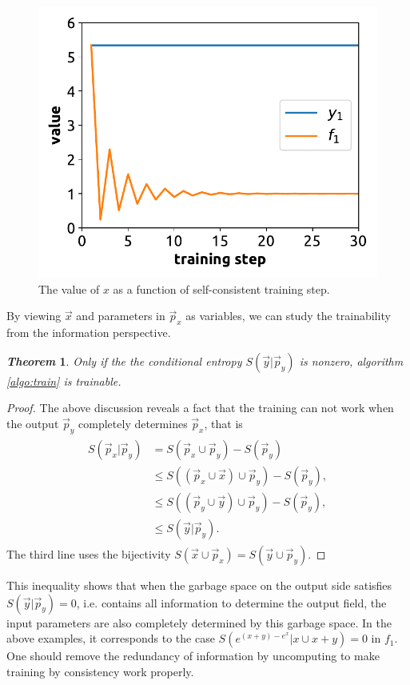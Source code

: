 \documentclass[aps,twocolumn,longbibliography,english,superscriptaddress,prr]{revtex4-1}
\newcommand{\<}{\langle}
\renewcommand{\>}{\rangle}
\newcommand{\vx}{{\vec x}}
\newcommand{\vp}{{\vec p}}
\newcommand{\vy}{{\vec y}}
\newtheorem{theorem}{\textit{Theorem}}
\theoremstyle{definition}\newtheorem{definition}{\textit{Definition}}
\begin{document}
\begin{figure}
    \centerline{\includegraphics[width=0.9\columnwidth,trim={0 0.3cm 0 0},clip]{images/fig1.pdf}}
    \caption{The value of $x$ as a function of self-consistent training step.}\label{fig:invtrain}
\end{figure}

By viewing $\vx$ and parameters in $\vp_x$ as variables, we can study the trainability from the information perspective.
\begin{theorem}
    Only if the the conditional entropy $S(\vy|\vp_y)$ is nonzero, algorithm \ref{algo:train} is trainable.
\end{theorem}
\begin{proof}
The above discussion reveals a fact that the training can not work when the output $\vp_y$ completely determines $\vp_x$, that is
\begin{align}
    \begin{split}
        S(\vp_x | \vp_y) &= S(\vp_x \cup \vp_y) - S(\vp_y)\\
        &\leq S\left((\vp_x \cup \vx) \cup \vp_y \right) - S(\vp_y),\\
        &\leq S\left((\vp_y \cup \vy) \cup \vp_y\right) - S(\vp_y),\\
    &\leq S(\vy|\vp_y).
    \end{split}
\end{align}
The third line uses the bijectivity $S(\vx \cup \vp_x) = S(\vy \cup \vp_y)$.
\end{proof}
This inequality shows that when the garbage space on the output side satisfies $S(\vy | \vp_y) = 0$, i.e. contains all information to determine the output field, the input parameters are also completely determined by this garbage space.
In the above examples, it corresponds to the case $S\left(e^{(x+y)-e^x} | x \cup x + y\right) = 0$ in $f_1$.
One should remove the redundancy of information by uncomputing to make training by consistency work properly.
\end{document}

